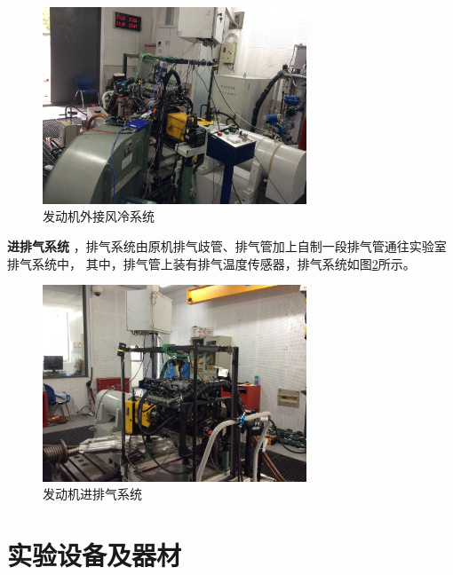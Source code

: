 \begin{figure}[H]
	\centering
	\includegraphics[width=0.7\textwidth]{thesis_figure/platformer_chapter/fllqxt}
	\caption{发动机外接风冷系统}
	\label{fig:fllqxt}
\end{figure}
\par\textbf{进排气系统}
，排气系统由原机排气歧管、排气管加上自制一段排气管通往实验室排气系统中，
其中，排气管上装有排气温度传感器，排气系统如图\ref{fig:jpqxt}所示。
\begin{figure}[H]
	\centering
	\includegraphics[width=0.7\textwidth]{thesis_figure/platformer_chapter/jpqxt}
	\caption{发动机进排气系统}
	\label{fig:jpqxt}
\end{figure}
\section{实验设备及器材}
